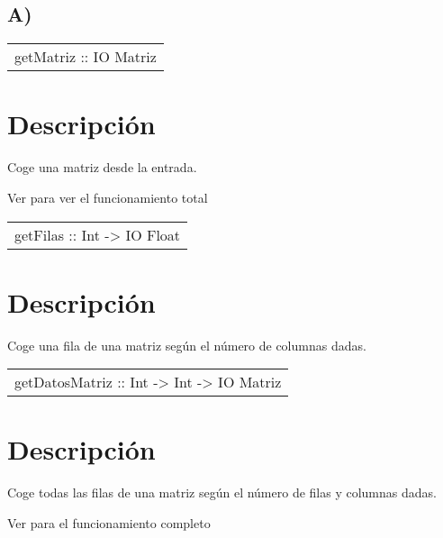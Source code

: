 \subsection{A)}
\begin{haddockdesc}
\item[\begin{tabular}{@{}l}
getMatriz :: IO Matriz
\end{tabular}]
{\haddockbegindoc
\section*{Descripción}
Coge una matriz desde la entrada.\par
Ver  para ver el funcionamiento total\par}
\end{haddockdesc}
\begin{haddockdesc}
\item[\begin{tabular}{@{}l}
getFilas :: Int -> IO {\char 91}Float{\char 93}
\end{tabular}]
{\haddockbegindoc
\section*{Descripción}
Coge una fila de una matriz según el número de columnas dadas.\par}
\end{haddockdesc}
\begin{haddockdesc}
\item[\begin{tabular}{@{}l}
getDatosMatriz :: Int -> Int -> IO Matriz
\end{tabular}]
{\haddockbegindoc
\section*{Descripción}
Coge todas las filas de una matriz según el número de filas y columnas dadas.\par
Ver  para el funcionamiento completo\par}
\end{haddockdesc}

